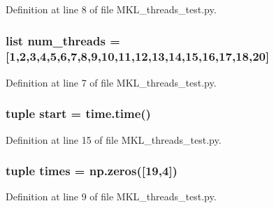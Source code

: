 Definition at line 8 of file M\-K\-L\-\_\-threads\-\_\-test.\-py.

\hypertarget{namespace_m_k_l__threads__test_ae6e79b48a519c1db19903d69a0bbdb23}{
\subsubsection[{num\-\_\-threads}]{\setlength{\rightskip}{0pt plus 5cm}list num\-\_\-threads = \mbox{[}1,2,3,4,5,6,7,8,9,10,11,12,13,14,15,16,17,18,20\mbox{]}}}\label{namespace_m_k_l__threads__test_ae6e79b48a519c1db19903d69a0bbdb23}


Definition at line 7 of file M\-K\-L\-\_\-threads\-\_\-test.\-py.

\hypertarget{namespace_m_k_l__threads__test_ac19c5d7b91bdfde51f8a7f0614c6e424}{
\subsubsection[{start}]{\setlength{\rightskip}{0pt plus 5cm}tuple start = time.\-time()}}\label{namespace_m_k_l__threads__test_ac19c5d7b91bdfde51f8a7f0614c6e424}


Definition at line 15 of file M\-K\-L\-\_\-threads\-\_\-test.\-py.

\hypertarget{namespace_m_k_l__threads__test_a7a4cdc1f55476e6705c9c39b53d8ecb9}{
\subsubsection[{times}]{\setlength{\rightskip}{0pt plus 5cm}tuple times = np.\-zeros(\mbox{[}19,4\mbox{]})}}\label{namespace_m_k_l__threads__test_a7a4cdc1f55476e6705c9c39b53d8ecb9}


Definition at line 9 of file M\-K\-L\-\_\-threads\-\_\-test.\-py.

